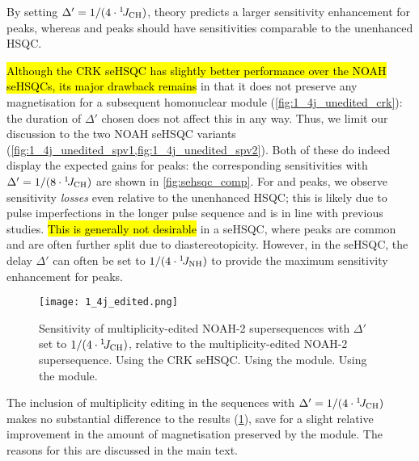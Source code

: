 By setting $\Delta' = 1/(4\cdot\onejch)$, theory predicts a larger sensitivity enhancement for  peaks, whereas  and  peaks should have sensitivities comparable to the unenhanced HSQC.

\hl{Although the CRK seHSQC has slightly better performance over the NOAH seHSQCs, its major drawback remains} in that it does not preserve any  magnetisation for a subsequent homonuclear module (\cref{fig:1_4j_unedited_crk}): the duration of $\Delta'$ chosen does not affect this in any way.
Thus, we limit our discussion to the two NOAH seHSQC variants (\cref{fig:1_4j_unedited_spv1,fig:1_4j_unedited_spv2}).
Both of these do indeed display the expected gains for  peaks: the corresponding sensitivities with $\Delta' = 1/(8\cdot\onejch)$ are shown in \cref{fig:sehsqc_comp}.
For  and  peaks, we observe sensitivity \textit{losses} even relative to the unenhanced HSQC; this is likely due to pulse imperfections in the longer pulse sequence and is in line with previous studies.\autocite{Schleucher1994JBNMR}
\hl{This is generally not desirable} in a \carbon{} seHSQC, where  peaks are common and are often further split due to diastereotopicity.
However, in the \nitrogen{} seHSQC, the delay $\Delta'$ can often be set to $1/(4\cdot\onejnh)$ to provide the maximum sensitivity enhancement for  peaks.

\begin{figure}[H]
    \centering
    \texttt{[image: 1\_4j\_edited.png]}
    {\label{fig:1_4j_edited_crk}}
    {\label{fig:1_4j_edited_spv1}}
    {\label{fig:1_4j_edited_spv2}}
    \caption{
        Sensitivity of multiplicity-edited NOAH-2  supersequences with $\Delta'$ set to $1/(4\cdot\onejch)$, relative to the multiplicity-edited NOAH-2  supersequence.
        \textbf{} Using the CRK seHSQC.
        \textbf{} Using the \noahSpa{} module.
        \textbf{} Using the \noahSpb{} module.
        \andro{}
    }
    \label{fig:1_4j_edited}
\end{figure}

The inclusion of multiplicity editing in the sequences with $\Delta' = 1/(4\cdot\onejch)$ makes no substantial difference to the results (\cref{fig:1_4j_edited}), save for a slight relative improvement in the amount of  magnetisation preserved by the \noahSpb{} module.
The reasons for this are discussed in the main text.

